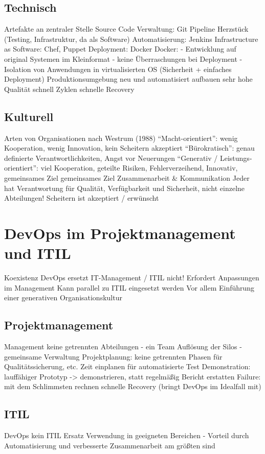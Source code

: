 \subsection{Technisch}
Artefakte an zentraler Stelle
Source Code Verwaltung: Git
Pipeline Herzstück (Testing, Infrastruktur, da als Software)
Automatisierung: Jenkins
Infrastructure as Software: Chef, Puppet
Deployment: Docker
Docker:
- Entwicklung auf original Systemen im Kleinformat
- keine Überraschungen bei Deployment
- Isolation von Anwendungen in virtualisierten OS (Sicherheit + einfaches Deployment)
Produktionsumgebung neu und automatisiert aufbauen
sehr hohe Qualität
schnell Zyklen
schnelle Recovery


\subsection{Kulturell}
Arten von Organisationen nach Westrum (1988)
“Macht-orientiert”: wenig Kooperation, wenig Innovation, kein Scheitern akzeptiert
“Bürokratisch”: genau definierte Verantwortlichkeiten, Angst vor Neuerungen
“Generativ / Leistungs-orientiert”: viel Kooperation, geteilte Risiken, Fehlerverzeihend, Innovativ, gemeinsames Ziel
gemeinsames Ziel
Zusammenarbeit \& Kommunikation
Jeder hat Verantwortung für Qualität, Verfügbarkeit und Sicherheit, nicht einzelne Abteilungen!
Scheitern ist akzeptiert / erwünscht


\section{DevOps im Projektmanagement und ITIL} %
Koexistenz
DevOps ersetzt IT-Management / ITIL nicht!
Erfordert Anpassungen im Management
Kann parallel zu ITIL eingesetzt werden
Vor allem Einführung einer generativen Organisationskultur

\subsection{Projektmanagement}
Management
keine getrennten Abteilungen - ein Team
Auflösung der Silos - gemeinsame Verwaltung
Projektplanung: keine getrennten Phasen für Qualitätssicherung, etc.
Zeit einplanen für automatisierte Test
Demonstration: lauffähiger Prototyp -> demonstrieren, statt regelmäßig Bericht erstatten
Failure: mit dem Schlimmsten rechnen
schnelle Recovery (bringt DevOps im Idealfall mit)

\subsection{ITIL}
DevOps kein ITIL Ersatz
Verwendung in geeigneten Bereichen
- Vorteil durch Automatisierung und verbesserte Zusammenarbeit am größten sind

